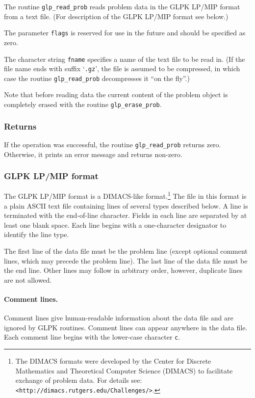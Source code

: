 The routine \verb|glp_read_prob| reads problem data in the GLPK LP/MIP
format from a text file. (For description of the GLPK LP/MIP format see
below.)

The parameter \verb|flags| is reserved for use in the future and should
be specified as zero.

The character string \verb|fname| specifies a name of the text file to
be read in. (If the file name ends with suffix `\verb|.gz|', the file
is assumed to be compressed, in which case the routine
\verb|glp_read_prob| decompresses it ``on the fly''.)

Note that before reading data the current content of the problem object
is completely erased with the routine \verb|glp_erase_prob|.

\subsubsection*{Returns}

If the operation was successful, the routine \verb|glp_read_prob|
returns zero. Otherwise, it prints an error message and returns
non-zero.

\subsubsection*{GLPK LP/MIP format}

The GLPK LP/MIP format is a DIMACS-like format.\footnote{The DIMACS
formats were developed by the Center for Discrete Mathematics and
Theoretical Computer Science (DIMACS) to facilitate exchange of problem
data. For details see: {\tt <http://dimacs.rutgers.edu/Challenges/>}. }
The file in this format is a plain ASCII text file containing lines of
several types described below. A line is terminated with the end-of-line
character. Fields in each line are separated by at least one blank
space. Each line begins with a one-character designator to identify the
line type.

The first line of the data file must be the problem line (except
optional comment lines, which may precede the problem line). The last
line of the data file must be the end line. Other lines may follow in
arbitrary order, however, duplicate lines are not allowed.

\paragraph{Comment lines.} Comment lines give human-readable
information about the data file and are ignored by GLPK routines.
Comment lines can appear anywhere in the data file. Each comment line
begins with the lower-case character \verb|c|.

